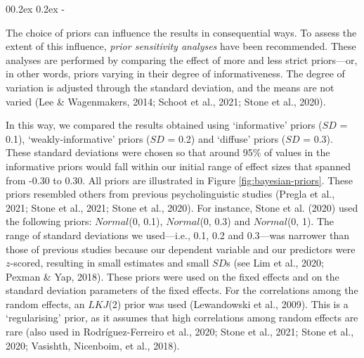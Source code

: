 \documentclass[
  12pt,
  man,floatsintext]{apa7}
\makeatletter
\let\oldsubparagraph\subparagraph
\renewcommand{\subparagraph}[1]{\oldsubparagraph{#1}\mbox{}}
\renewcommand{\subparagraph}[1]{\@startsection{subparagraph}{5}{1em}%
  {0\baselineskip \@plus 0.2ex \@minus 0.2ex}%
  {-\z@\relax}%
  {\normalfont\normalsize\itshape\hspace{\parindent}{#1}\textit{\addperi}}{\relax}}
\makeatother
\begin{document}
\hypertarget{prior-distributions-and-prior-predictive-checks}{%
\subparagraph{Prior distributions and prior predictive checks}\label{prior-distributions-and-prior-predictive-checks}}

The choice of priors can influence the results in consequential ways. To assess the extent of this influence, \emph{prior sensitivity analyses} have been recommended. These analyses are performed by comparing the effect of more and less strict priors---or, in other words, priors varying in their degree of informativeness. The degree of variation is adjusted through the standard deviation, and the means are not varied (Lee \& Wagenmakers, 2014; Schoot et al., 2021; Stone et al., 2020).

In this way, we compared the results obtained using `informative' priors (\(SD\) = 0.1), `weakly-informative' priors (\(SD\) = 0.2) and `diffuse' priors (\(SD\) = 0.3). These standard deviations were chosen so that around 95\% of values in the informative priors would fall within our initial range of effect sizes that spanned from -0.30 to 0.30. All priors are illustrated in Figure \ref{fig:bayesian-priors}. These priors resembled others from previous psycholinguistic studies (Pregla et al., 2021; Stone et al., 2021; Stone et al., 2020). For instance, Stone et al. (2020) used the following priors: \(Normal\)(0, 0.1), \(Normal\)(0, 0.3) and \(Normal\)(0, 1). The range of standard deviations we used---i.e., 0.1, 0.2 and 0.3---was narrower than those of previous studies because our dependent variable and our predictors were \(z\)-scored, resulting in small estimates and small \(SD\)s (see Lim et al., 2020; Pexman \& Yap, 2018). These priors were used on the fixed effects and on the standard deviation parameters of the fixed effects. For the correlations among the random effects, an \(LKJ\)(2) prior was used (Lewandowski et al., 2009). This is a `regularising' prior, as it assumes that high correlations among random effects are rare (also used in Rodríguez-Ferreiro et al., 2020; Stone et al., 2021; Stone et al., 2020; Vasishth, Nicenboim, et al., 2018).
\end{document}
